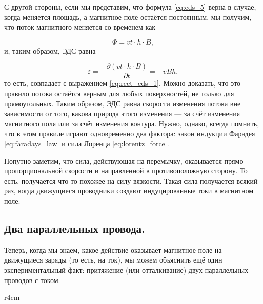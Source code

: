 \documentclass[a4paper,12pt]{article}
\numberwithin{equation}{section}
\newcommand{\pt}{\partial}
\newcommand{\vareps}{\varepsilon}
\begin{document}
С другой стороны, если мы представим, что формула \eqref{eq:eds_5}
верна в случае, когда меняется площадь, а магнитное поле остаётся
постоянным, мы получим, что поток магнитного меняется со временем как 

\begin{equation}
  \label{eq:rect_eds_2}
  \Phi = vt\cdot h \cdot B,
\end{equation}
и, таким образом, ЭДС равна 

\begin{equation}
  \label{eq:rect_eds_3}
  \vareps = -\frac{\pt \left( vt \cdot h \cdot B \right)}{\pt t} = - v B h,
\end{equation}
то есть, совпадает с выражением \eqref{eq:rect_eds_1}. Можно доказать,
что это правило потока остаётся верным для любых поверхностей, не
только для прямоугольных. Таким образом, ЭДС равна скорости изменения
потока вне зависимости от того, какова природа этого изменения --- за
счёт изменения магнитного поля или за счёт изменения контура. Нужно,
однако, всегда помнить, что в этом правиле играют одновременно два
фактора: закон индукции Фарадея \eqref{eq:faradays_law} и сила Лоренца
\eqref{eq:lorentz_force}.

Попутно заметим, что сила, действующая на перемычку, оказывается прямо
пропорциональной скорости и направленной в противоположную сторону. То
есть, получается что-то похожее на силу вязкости. Такая сила
получается всякий раз, когда движущиеся проводники создают
индуцированные токи в магнитном поле.

\subsection{Два параллельных провода.}
\label{sec:two_parallel_lines}

Теперь, когда мы знаем, какое действие оказывает магнитное поле на
движущиеся заряды (то есть, на ток), мы можем объяснить ещё один
экспериментальный факт: притяжение (или отталкивание) двух
параллельных проводов с током.

\begin{wrapfigure}{r}{4cm}
\centering
{}
\label{fig:current_wire_ampere}
\end{wrapfigure}
\end{document}
